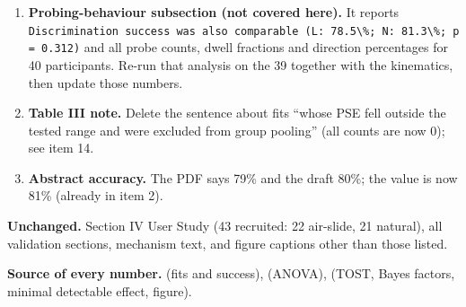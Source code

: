 \documentclass[11pt,a4paper]{article}
\begin{document}
\begin{enumerate}[resume]
\item \textbf{Probing-behaviour subsection (not covered here).} It reports \texttt{Discrimination success was also comparable (L: 78.5\textbackslash\%; N: 81.3\textbackslash\%; p = 0.312)} and all probe counts, dwell fractions and direction percentages for 40 participants. Re-run that analysis on the 39 together with the kinematics, then update those numbers.

\item \textbf{Table III note.} Delete the sentence about fits ``whose PSE fell outside the tested range and were excluded from group pooling'' (all counts are now 0); see item 14.

\item \textbf{Abstract accuracy.} The PDF says 79\% and the draft 80\%; the value is now 81\% (already in item 2).
\end{enumerate}

\bigskip
\noindent\textbf{Unchanged.} Section IV User Study (43 recruited: 22 air-slide, 21 natural), all validation sections, mechanism text, and figure captions other than those listed.

\medskip
\noindent\textbf{Source of every number.}  (fits and success),  (ANOVA),  (TOST, Bayes factors, minimal detectable effect, figure).
\end{document}
